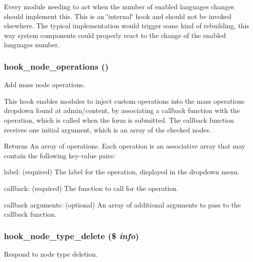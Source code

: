Every module needing to act when the number of enabled languages changes should implement this. This is an \char`\"{}internal\char`\"{} hook and should not be invoked elsewhere. The typical implementation would trigger some kind of rebuilding, this way system components could properly react to the change of the enabled languages number. \hypertarget{group__hooks_gadedee7943c08aeed54ea520c34471a28}{
\subsubsection[{hook\_\-node\_\-operations}]{\setlength{\rightskip}{0pt plus 5cm}hook\_\-node\_\-operations ()}}
\label{group__hooks_gadedee7943c08aeed54ea520c34471a28}
Add mass node operations.

This hook enables modules to inject custom operations into the mass operations dropdown found at admin/content, by associating a callback function with the operation, which is called when the form is submitted. The callback function receives one initial argument, which is an array of the checked nodes.

\begin{DoxyReturn}{Returns}
An array of operations. Each operation is an associative array that may contain the following key-\/value pairs:
\begin{DoxyItemize}
\item label: (required) The label for the operation, displayed in the dropdown menu.
\item callback: (required) The function to call for the operation.
\item callback arguments: (optional) An array of additional arguments to pass to the callback function. 
\end{DoxyItemize}
\end{DoxyReturn}
\hypertarget{group__hooks_ga35ae5b1a494322b02d03ae00a98ac77b}{
\subsubsection[{hook\_\-node\_\-type\_\-delete}]{\setlength{\rightskip}{0pt plus 5cm}hook\_\-node\_\-type\_\-delete (\$ {\em info})}}
\label{group__hooks_ga35ae5b1a494322b02d03ae00a98ac77b}
Respond to node type deletion.

